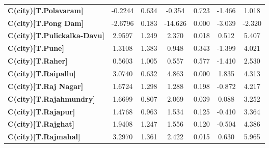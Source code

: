 \begin{center}
\begin{tabular}{lcccccc}
\textbf{C(city)[T.Polavaram]}                                                                       &      -0.2244  &        0.634     &    -0.354  &         0.723        &       -1.466    &        1.018     \\
\textbf{C(city)[T.Pong Dam]}                                                                        &      -2.6796  &        0.183     &   -14.626  &         0.000        &       -3.039    &       -2.320     \\
\textbf{C(city)[T.Pulickalka-Davu]}                                                                 &       2.9597  &        1.249     &     2.370  &         0.018        &        0.512    &        5.407     \\
\textbf{C(city)[T.Pune]}                                                                            &       1.3108  &        1.383     &     0.948  &         0.343        &       -1.399    &        4.021     \\
\textbf{C(city)[T.Raher]}                                                                           &       0.5603  &        1.005     &     0.557  &         0.577        &       -1.410    &        2.530     \\
\textbf{C(city)[T.Raipallu]}                                                                        &       3.0740  &        0.632     &     4.863  &         0.000        &        1.835    &        4.313     \\
\textbf{C(city)[T.Raj Nagar]}                                                                       &       1.6724  &        1.298     &     1.288  &         0.198        &       -0.872    &        4.217     \\
\textbf{C(city)[T.Rajahmundry]}                                                                     &       1.6699  &        0.807     &     2.069  &         0.039        &        0.088    &        3.252     \\
\textbf{C(city)[T.Rajapur]}                                                                         &       1.4768  &        0.963     &     1.534  &         0.125        &       -0.410    &        3.364     \\
\textbf{C(city)[T.Rajghat]}                                                                         &       1.9408  &        1.247     &     1.556  &         0.120        &       -0.504    &        4.386     \\
\textbf{C(city)[T.Rajmahal]}                                                                        &       3.2970  &        1.361     &     2.422  &         0.015        &        0.630    &        5.965     \\

\end{tabular}
\end{center}
